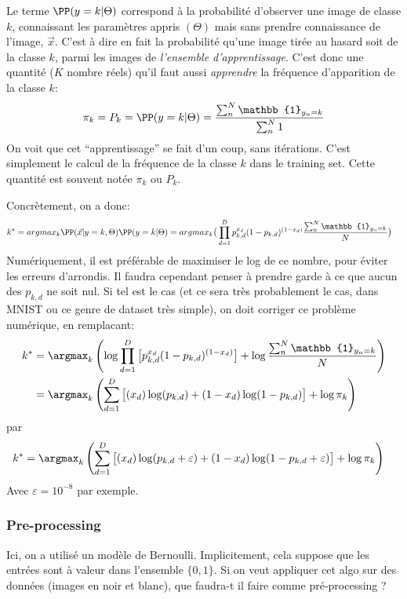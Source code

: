 \documentclass[french,twoside]{article}
\begin{document}
Le terme $\PP(y=k|\Theta) $ correspond à la probabilité d'observer une image de classe $k$, connaissant les paramètres appris $(\Theta)$ mais sans prendre connaissance de l'image, $\vec{x}$. C'est à dire en fait la probabilité qu'une image tirée au hasard soit de la classe $k$, parmi les images de \textit{l'ensemble d'apprentissage}. C'est donc une quantité ($K$ nombre réels) qu'il faut aussi \textit{apprendre} la fréquence d'apparition de la classe $k$:
\begin{align}
\pi_k = P_k = \PP(y=k|\Theta) = \frac{\sum_n^N \mathbb{1}_{y_n=k}  }{\sum_n^N 1}
\end{align}
On voit que cet ``apprentissage'' se fait d'un coup, sans itérations. C'est simplement le calcul de la fréquence de la classe $k$ dans le training set.
Cette quantité est souvent notée $\pi_k$ ou $P_k$.

Concrètement, on a donc:
\begin{align}
k^*
&= argmax_k  \PP (\vec{x}| y=k, \Theta   ) \PP(y=k|\Theta) 
= argmax_k  \big( 
\prod_{d=1}^D p_{k,d}^{x_{d}} (1-p_{k,d})^{(1-x_{d})} 
\frac{\sum_n^N \mathbb{1}_{y_n=k}  }{N} 
\big)
\end{align}
Numériquement, il est préférable de maximiser le log de ce nombre, pour éviter les erreurs d'arrondis. Il faudra cependant penser à prendre garde à ce que aucun des $p_{k,d}$ ne soit nul. Si tel est le cas (et ce sera très probablement le cas, dans MNIST ou ce genre de dataset très simple), on doit corriger ce problème numérique,
en remplacant:
\begin{align}
k^*
&= \argmax_k  \left( \log
\prod_{d=1}^D
\big[p_{k,d}^{x_{d}} (1-p_{k,d})^{(1-x_{d})} 
\big]
+ \log \frac{\sum_n^N \mathbb{1}_{y_n=k}  }{N} 
\right)
\\
&= \argmax_k  \left( 
\sum_{d=1}^D
\big[
(x_{d})\log(p_{k,d}) + (1-x_{d})\log(1-p_{k,d})  
\big]
+ \log  \pi_k
\right)
\end{align}
par
\begin{align}
k^* 
&= \argmax_k  \left( 
\sum_{d=1}^D
\big[
(x_{d})\log(p_{k,d}+\varepsilon) + (1-x_{d})\log(1-p_{k,d}+\varepsilon)  
\big]
+ \log \pi_k
\right)
\end{align}
Avec $\varepsilon =10^{-8}$ par exemple.

\subsubsection{Pre-processing}

Ici, on a utilisé un modèle de Bernoulli. Implicitement, cela suppose que les entrées sont à valeur dans l'ensemble $\{0,1\}$.
Si on veut appliquer cet algo sur des données (images en noir et blanc), que faudra-t il faire comme pré-processing ?
\end{document}
